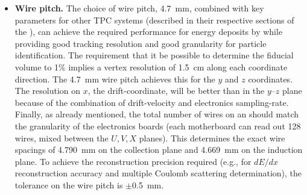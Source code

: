 \begin{itemize}
\item \textbf{Wire pitch.} The choice of wire pitch, \SI{4.7}{mm}, combined with key parameters for other TPC systems (described in their respective sections of the ), can achieve the required performance for energy deposits by  while providing good tracking resolution and good granularity for particle identification. The \single requirement that it be possible to determine the fiducial volume to \num{1}\% implies a vertex resolution of \SI{1.5}{cm} along each coordinate direction. The \SI{4.7}{mm} wire pitch achieves this for the $y$ and $z$ coordinates.  The resolution on $x$, the drift-coordinate, will be better than in the $y$--$z$ plane because of the combination of drift-velocity and electronics sampling-rate.  Finally, as already mentioned, the total number of wires on an  should match the granularity of the electronics boards (each  motherboard can read out \num{128} wires, mixed between the $U,V,X$ planes). This determines the exact wire spacings of \SI{4.790}{mm} on the collection plane and \SI{4.669}{mm} on the induction plane.  To achieve the reconstruction precision required (e.g., for $dE/dx$ reconstruction accuracy and multiple Coulomb scattering determination), the tolerance on the wire pitch is $\pm$\SI{0.5}{mm}.


\end{itemize}
